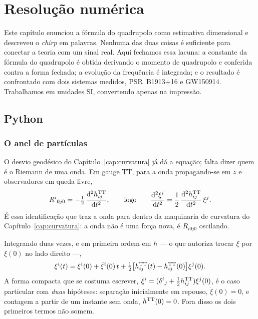 \section{Resolução numérica}
\label{sec:cap09-numerica}

Este capítulo enunciou a fórmula do quadrupolo como estimativa dimensional e
descreveu o \emph{chirp} em palavras. Nenhuma das duas coisas é suficiente
para conectar a teoria com um sinal real. Aqui fechamos essa lacuna: a
constante da fórmula do quadrupolo é obtida derivando o momento de quadrupolo
e conferida contra a forma fechada; a evolução da frequência é integrada; e o
resultado é confrontado com dois sistemas medidos, PSR~B1913+16 e GW150914.
Trabalhamos em unidades SI, convertendo apenas na impressão.

\subsection{Python}


\subsubsection*{O anel de partículas}

O desvio geodésico do Capítulo~\ref{cap:curvatura} já dá a equação; falta
dizer quem é o Riemann de uma onda. Em gauge TT, para a onda propagando-se em
$z$ e observadores em queda livre,
\begin{equation}
  R^{i}{}_{0j0} = -\tfrac12\,\frac{\mathrm{d} ^{2}h^{\rm TT}_{ij}}{\mathrm{d} t^{2}} ,
  \qquad\text{logo}\qquad
  \frac{\mathrm{d} ^{2}\xi^{i}}{\mathrm{d} t^{2}} = \frac{1}{2}\,\frac{\mathrm{d} ^{2}h^{\rm TT}_{ij}}{\mathrm{d} t^{2}}\,\xi^{j} .
  \label{eq:cap10-anel}
\end{equation}
É essa identificação que traz a onda para dentro da maquinaria de curvatura
do Capítulo~\ref{cap:curvatura}: a onda não é uma força nova, é
$R_{i0j0}$ oscilando.

Integrando duas vezes, e em primeira ordem em $h$ --- o que autoriza trocar
$\xi$ por $\xi(0)$ no lado direito ---,
\begin{equation}
  \xi^{i}(t) = \xi^{i}(0) + \dot\xi^{i}(0)\,t
  + \tfrac12\bigl[h^{\rm TT}_{ij}(t) - h^{\rm TT}_{ij}(0)\bigr]\xi^{j}(0) .
  \label{eq:cap10-anel-geral}
\end{equation}
A forma compacta que se costuma escrever,
$\xi^{i}=(\delta^{i}{}_{j}+\tfrac12 h^{\rm TT}_{ij})\xi^{j}(0)$, é o caso
particular com \emph{duas} hipóteses: separação inicialmente em repouso,
$\dot\xi(0)=0$, e contagem a partir de um instante sem onda,
$h^{\rm TT}(0)=0$. Fora disso os dois primeiros termos não somem.

